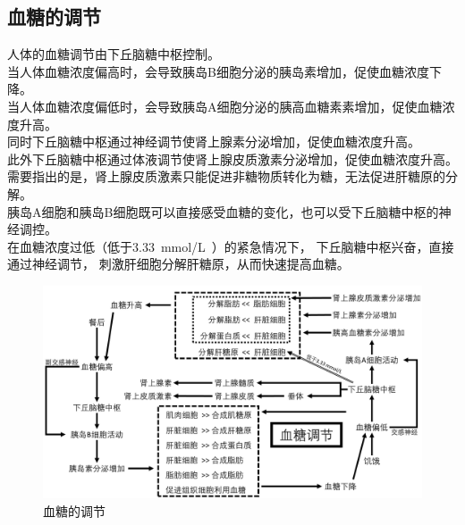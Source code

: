 \documentclass[UTF8]{ctexart}
\begin{document}
\subsection{血糖的调节}
    人体的血糖调节由下丘脑糖中枢控制。\\[3mm]
    当人体血糖浓度偏高时，会导致胰岛B细胞分泌的胰岛素增加，促使血糖浓度下降。\\[3mm]
    当人体血糖浓度偏低时，会导致胰岛A细胞分泌的胰高血糖素素增加，促使血糖浓度升高。\\[3mm]
    同时下丘脑糖中枢通过神经调节使肾上腺素分泌增加，促使血糖浓度升高。\\[3mm]
    此外下丘脑糖中枢通过体液调节使肾上腺皮质激素分泌增加，促使血糖浓度升高。\\[3mm]
    需要指出的是，肾上腺皮质激素只能促进非糖物质转化为糖，无法促进肝糖原的分解。\\[3mm]
    胰岛A细胞和胰岛B细胞既可以直接感受血糖的变化，也可以受下丘脑糖中枢的神经调控。\\[3mm]
    在血糖浓度过低（低于$3.33$~mmol/L~）的紧急情况下，
    下丘脑糖中枢兴奋，直接通过神经调节，
    刺激肝细胞分解肝糖原，从而快速提高血糖。\vspace{15pt}
    \begin{figure}[h]
        \begin{center}
            \includegraphics[width=14cm]{BiologyImage/55.jpg}
        \end{center}
        \caption{血糖的调节}
    \end{figure}

\newpage
\end{document}
